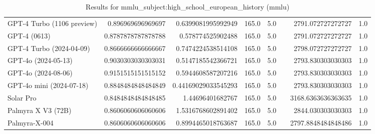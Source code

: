 \begin{table}[htp]
{\begin{tabular}{lrrrrrrr}
GPT-4 Turbo (1106 preview) & 0.896969696969697 & 0.6399081995992949 & 165.0 & 5.0 &  & 2791.072727272727 & 1.0 \\
GPT-4 (0613) & 0.8787878787878788 & 0.578774525902488 & 165.0 & 5.0 &  & 2791.072727272727 & 1.0 \\
GPT-4 Turbo (2024-04-09) & 0.8666666666666667 & 0.7474224538514108 & 165.0 & 5.0 &  & 2798.072727272727 & 1.0 \\
GPT-4o (2024-05-13) & 0.9030303030303031 & 0.5147185542366721 & 165.0 & 5.0 &  & 2793.830303030303 & 1.0 \\
GPT-4o (2024-08-06) & 0.9151515151515152 & 0.5944608587207216 & 165.0 & 5.0 &  & 2793.830303030303 & 1.0 \\
GPT-4o mini (2024-07-18) & 0.8848484848484849 & 0.44169029033545293 & 165.0 & 5.0 &  & 2793.830303030303 & 1.0 \\
Solar Pro & 0.8484848484848485 & 1.44696401682767 & 165.0 & 5.0 &  & 3168.6363636363635 & 1.0 \\
Palmyra X V3 (72B) & 0.8606060606060606 & 1.5316768602891402 & 165.0 & 5.0 &  & 2844.030303030303 & 1.0 \\
Palmyra-X-004 & 0.8606060606060606 & 0.8994465018763687 & 165.0 & 5.0 &  & 2797.8848484848486 & 1.0 \\
\bottomrule
\end{tabular}}
\caption{Results for mmlu_subject:high_school_european_history (mmlu)}
\label{fig:mmlu_subject:high_school_european_history (mmlu)}
\end{table}